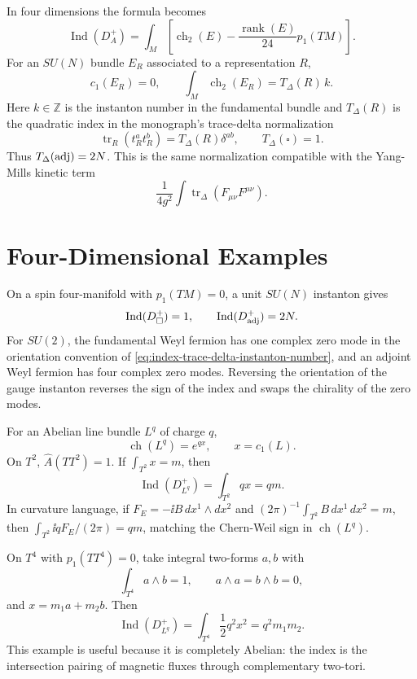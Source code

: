 In four dimensions the formula becomes
\begin{equation}
  \operatorname{Ind}(D_A^+)
  =
  \int_M
  \left[
  \operatorname{ch}_2(E)
  -
  \frac{\operatorname{rank}(E)}{24}p_1(TM)
  \right].
  \label{eq:index-four-dimensional-formula}
\end{equation}
For an \(SU(N)\) bundle \(E_R\) associated to a representation \(R\),
\begin{equation}
  c_1(E_R)=0,
  \qquad
  \int_M\operatorname{ch}_2(E_R)=T_\Delta(R)\,k .
  \label{eq:index-trace-delta-instanton-number}
\end{equation}
Here \(k\in\mathbb Z\) is the instanton number in the fundamental bundle and
\(T_\Delta(R)\) is the quadratic index in the monograph's trace-delta
normalization
\[
  \operatorname{tr}_R(t^a_Rt^b_R)=T_\Delta(R)\delta^{ab},
  \qquad
  T_\Delta(\square)=1.
\]
Thus \(T_\Delta({\rm adj})=2N\).  This is the same normalization compatible
with the Yang-Mills kinetic term
\[
  \frac{1}{4g^2}\int\operatorname{tr}_\Delta(F_{\mu\nu}F^{\mu\nu}).
\]

\section{Four-Dimensional Examples}

On a spin four-manifold with \(p_1(TM)=0\), a unit \(SU(N)\) instanton gives
\[
  \operatorname{Ind}(D_{\square}^+)=1,
  \qquad
  \operatorname{Ind}(D_{\rm adj}^+)=2N .
\]
For \(SU(2)\), the fundamental Weyl fermion has one complex zero mode in the
orientation convention of \eqref{eq:index-trace-delta-instanton-number}, and
an adjoint Weyl fermion has four complex zero modes.  Reversing the
orientation of the gauge instanton reverses the sign of the index and swaps
the chirality of the zero modes.

For an Abelian line bundle \(L^q\) of charge \(q\),
\[
  \operatorname{ch}(L^q)=e^{q x},
  \qquad x=c_1(L).
\]
On \(T^2\), \(\widehat A(TT^2)=1\).  If
\(\int_{T^2}x=m\), then
\begin{equation}
  \operatorname{Ind}(D_{L^q}^+)
  =
  \int_{T^2}q x
  =
  qm .
  \label{eq:index-u1-t2-example}
\end{equation}
In curvature language, if \(F_E=-\ii B\,dx^1\wedge dx^2\) and
\((2\pi)^{-1}\int_{T^2}B\,dx^1\,dx^2=m\), then
\(\int_{T^2} \ii qF_E/(2\pi)=qm\), matching the Chern-Weil sign in
\(\operatorname{ch}(L^q)\).

On \(T^4\) with \(p_1(TT^4)=0\), take integral two-forms \(a,b\) with
\[
  \int_{T^4}a\wedge b=1,
  \qquad a\wedge a=b\wedge b=0,
\]
and \(x=m_1a+m_2b\).  Then
\begin{equation}
  \operatorname{Ind}(D_{L^q}^+)
  =
  \int_{T^4}\frac12q^2x^2
  =
  q^2m_1m_2 .
  \label{eq:index-u1-t4-example}
\end{equation}
This example is useful because it is completely Abelian: the index is the
intersection pairing of magnetic fluxes through complementary two-tori.

